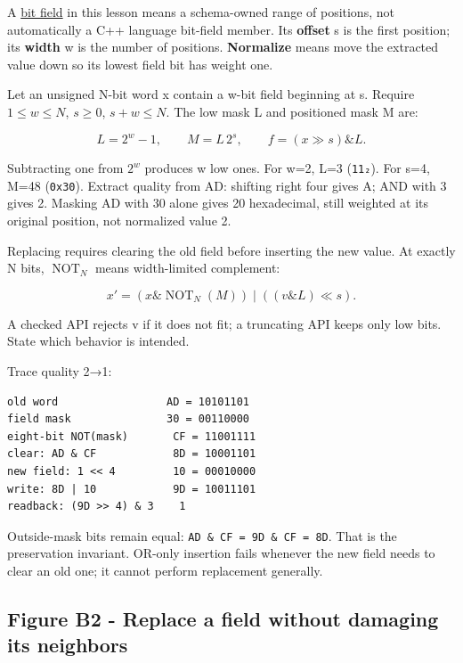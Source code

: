 A \hyperref[appendix-ac697f5c66e8]{bit field} in this lesson means a schema-owned range of positions, not automatically a C++ language bit-field member. Its \textbf{offset} s is the first position; its \textbf{width} w is the number of positions. \textbf{Normalize} means move the extracted value down so its lowest field bit has weight one.

Let an unsigned N-bit word x contain a w-bit field beginning at s. Require \(1\le w\le N\), \(s\ge0\), \(s+w\le N\). The low mask L and positioned mask M are:

\[
L=2^w-1,\qquad M=L\,2^s,\qquad f=(x\gg s)\mathbin{\&}L.
\]

Subtracting one from \(2^w\) produces w low ones. For w=2, L=3 (\texttt{11₂}). For s=4, M=48 (\texttt{0x30}). Extract quality from AD: shifting right four gives A; AND with 3 gives 2. Masking AD with 30 alone gives 20 hexadecimal, still weighted at its original position, not normalized value 2.

Replacing requires clearing the old field before inserting the new value. At exactly N bits, \(\operatorname{NOT}_N\) means width-limited complement:

\[
x'=(x\mathbin{\&}\operatorname{NOT}_N(M))
\mathbin{|}((v\mathbin{\&}L)\ll s).
\]

A checked API rejects v if it does not fit; a truncating API keeps only low bits. State which behavior is intended.

Trace quality 2→1:

\begin{verbatim}
old word                 AD = 10101101
field mask               30 = 00110000
eight-bit NOT(mask)       CF = 11001111
clear: AD & CF            8D = 10001101
new field: 1 << 4         10 = 00010000
write: 8D | 10            9D = 10011101
readback: (9D >> 4) & 3    1
\end{verbatim}

Outside-mask bits remain equal: \texttt{AD\ \&\ CF\ =\ 9D\ \&\ CF\ =\ 8D}. That is the preservation invariant. OR-only insertion fails whenever the new field needs to clear an old one; it cannot perform replacement generally.

\subsection{Figure B2 - Replace a field without damaging its neighbors}\label{01-foundations-i-ch001-figure-b2---replace-a-field-without-damaging-its-neighbors}

